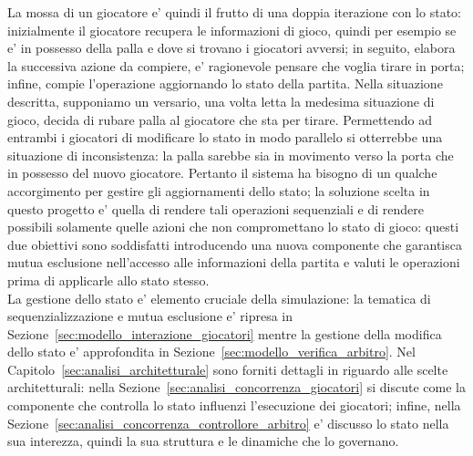 La mossa di un giocatore e' quindi il frutto di una doppia iterazione con lo stato: inizialmente il giocatore recupera le informazioni di gioco, quindi per esempio se e' in possesso della palla e dove si trovano i giocatori avversi; in seguito, elabora la successiva azione da compiere, e' ragionevole pensare che voglia tirare in porta; infine, compie l'operazione aggiornando lo stato della partita. Nella situazione descritta, supponiamo un versario, una volta letta la medesima situazione di gioco, decida di rubare palla al giocatore che sta per tirare. Permettendo ad entrambi i giocatori di modificare lo stato in modo parallelo si otterrebbe una situazione di inconsistenza: la palla sarebbe sia in movimento verso la porta che in possesso del nuovo giocatore.
Pertanto il sistema ha bisogno di un qualche accorgimento per gestire gli aggiornamenti dello stato; la soluzione scelta in questo progetto e' quella di rendere tali operazioni sequenziali e di rendere possibili solamente quelle azioni che non compromettano lo stato di gioco: questi due obiettivi sono soddisfatti introducendo una nuova componente che garantisca mutua esclusione nell'accesso alle informazioni della partita e valuti le operazioni prima di applicarle allo stato stesso.\\

La gestione dello stato e' elemento cruciale della simulazione: la tematica di sequenzializzazione e mutua esclusione e' ripresa in Sezione~\ref{sec:modello_interazione_giocatori} mentre la gestione della modifica dello stato e' approfondita in Sezione~\ref{sec:modello_verifica_arbitro}. Nel Capitolo~\ref{sec:analisi_architetturale} sono forniti dettagli in riguardo alle scelte architetturali: nella Sezione~\ref{sec:analisi_concorrenza_giocatori} si discute come la componente che controlla lo stato influenzi l'esecuzione dei giocatori; infine, nella Sezione~\ref{sec:analisi_concorrenza_controllore_arbitro} e' discusso lo stato nella sua interezza, quindi la sua struttura e le dinamiche che lo governano.
